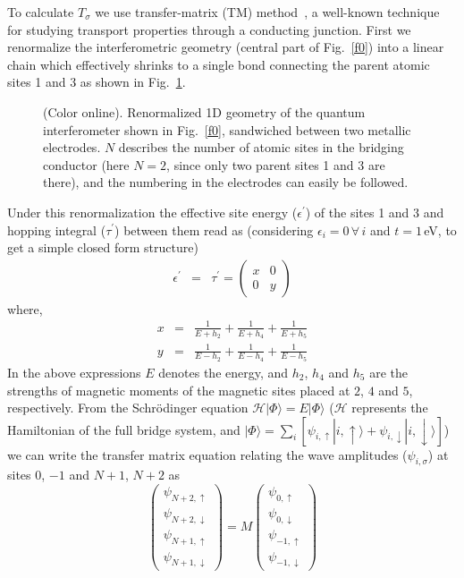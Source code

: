 \documentclass[doublecol]{epl2}
\begin{document}
To calculate $T_{\sigma}$ we use transfer-matrix (TM) 
method~\cite{tm1,tm2}, 
a well-known technique for studying transport properties through a 
conducting junction. First we renormalize the interferometric geometry 
(central part of Fig.~\ref{f0}) into a linear chain which effectively 
shrinks to a single bond connecting the parent atomic sites 1 and 3 as 
shown in Fig.~\ref{rgmodel}.
\begin{figure}[ht]
{\centering {}\par}
\caption{(Color online). Renormalized 1D geometry of the quantum 
interferometer shown in Fig.~\ref{f0}, sandwiched between two metallic 
electrodes. $N$ describes the number of atomic sites in the bridging 
conductor (here $N=2$, since only two parent sites 1 and 3 are there), 
and the numbering in the electrodes can easily be followed.}
\label{rgmodel}
\end{figure}
Under this renormalization the effective site energy ($\epsilon^{\prime}$)
of the sites 1 and 3 and hopping integral ($\tau^{\prime}$) between them 
read as (considering $\epsilon_i=0\,\forall\,i$ and $t=1\,$eV, to get a 
simple closed form structure)
\begin{eqnarray}
\epsilon^{\prime} &=& \tau^{\prime}
=\left(\begin{array}{cc}
x & 0\\
0 & y
\end{array}\right)
\end{eqnarray}
where,
\begin{eqnarray}
x&=&\frac{1}{E + h_2} + \frac{1}{E + h_4} + \frac{1}{E + h_5} \\
y&=&\frac{1}{E - h_2} + \frac{1}{E - h_4} + \frac{1}{E - h_5}
\end{eqnarray}
In the above expressions $E$ denotes the energy, and $h_2$, $h_4$ and 
$h_5$ are the strengths of magnetic moments of the magnetic sites placed 
at $2$, $4$ and $5$, respectively. From the Schr\"{o}dinger equation
$\mathcal{H}|\Phi\rangle=E |\Phi\rangle$ ($\mathcal{H}$ represents the 
Hamiltonian of the full bridge system, and 
$|\Phi\rangle=\sum_i[\psi_{i,\uparrow}|i,\uparrow\rangle + 
\psi_{i,\downarrow}|i,\downarrow\rangle]$) we can write the transfer matrix 
equation relating the wave amplitudes ($\psi_{i,\sigma}$) at sites $0$, 
$−1$ and $N + 1$, $N + 2$ as
\begin{equation}
\left(\begin{array}{cc}
    \psi_{N+2,\uparrow} \\
    \psi_{N+2,\downarrow}\\ 
    \psi_{N+1,\uparrow}\\
    \psi_{N+1,\downarrow}
\end{array}\right)
=M\left(\begin{array}{cc}
    \psi_{0,\uparrow} \\ 
    \psi_{0,\downarrow}\\
    \psi_{-1,\uparrow}\\
    \psi_{-1,\downarrow} 
\end{array}\right)
\label{equation8}
\end{equation}
\end{document}
